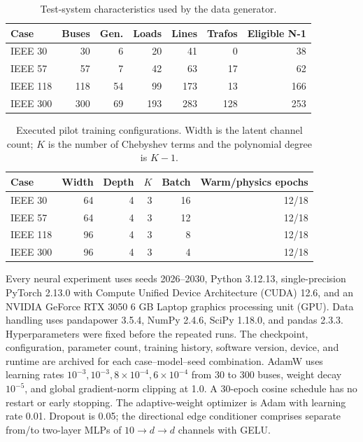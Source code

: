 \documentclass[final,5p,times,twocolumn]{elsarticle}
\begin{document}
\begin{table}[t]
  \centering
  \caption{Test-system characteristics used by the data generator.}
  \label{tab:systems}
  \begin{tabular}{lrrrrrr}
    \toprule
    Case & Buses & Gen. & Loads & Lines & Trafos & Eligible N-1 \\
    \midrule
    IEEE 30  & 30  & 6  & 20  & 41  & 0   & 38  \\
    IEEE 57  & 57  & 7  & 42  & 63  & 17  & 62  \\
    IEEE 118 & 118 & 54 & 99  & 173 & 13  & 166 \\
    IEEE 300 & 300 & 69 & 193 & 283 & 128 & 253 \\
    \bottomrule
  \end{tabular}
\end{table}

\begin{table}[t]
  \centering
  \caption{Executed pilot training configurations. Width is the latent channel
  count; $K$ is the number of Chebyshev terms and the polynomial degree is
  $K-1$.}
  \label{tab:hyperparameters}
  \begin{tabular}{lrrrrr}
    \toprule
    Case & Width & Depth & $K$ & Batch & Warm/physics epochs \\
    \midrule
    IEEE 30  & 64 & 4 & 3 & 16 & 12/18 \\
    IEEE 57  & 64 & 4 & 3 & 12 & 12/18 \\
    IEEE 118 & 96 & 4 & 3 & 8  & 12/18 \\
    IEEE 300 & 96 & 4 & 3 & 4  & 12/18 \\
    \bottomrule
  \end{tabular}
\end{table}

Every neural experiment uses seeds 2026--2030, Python 3.12.13,
single-precision PyTorch 2.13.0 with Compute Unified Device Architecture
(CUDA) 12.6, and an NVIDIA GeForce RTX 3050 6 GB Laptop graphics processing
unit (GPU). Data handling uses pandapower 3.5.4, NumPy 2.4.6, SciPy
1.18.0, and pandas 2.3.3. Hyperparameters were fixed before the repeated runs.
The checkpoint, configuration, parameter count, training history, software
version, device, and runtime are archived for each case--model--seed
combination. AdamW uses learning rates
$10^{-3},10^{-3},8{\times}10^{-4},6{\times}10^{-4}$ from 30 to 300 buses,
weight decay $10^{-5}$, and global gradient-norm clipping at 1.0. A
30-epoch cosine schedule has no restart or early stopping. The adaptive-weight
optimizer is Adam with learning rate 0.01. Dropout is 0.05; the directional
edge conditioner comprises separate from/to two-layer MLPs of
$10\!\rightarrow\!d\!\rightarrow\!d$ channels with GELU.
\end{document}
